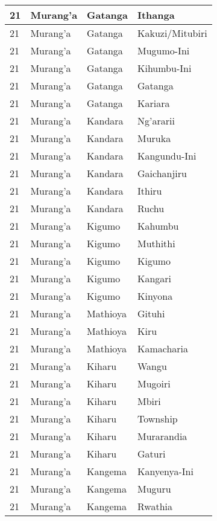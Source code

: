 \begin{table}[!ht]
\begin{tabular}{|l|l|l|l|}
        21 & Murang’a & Gatanga & Ithanga \\ \hline
        21 & Murang’a & Gatanga & Kakuzi/Mitubiri \\ \hline
        21 & Murang’a & Gatanga & Mugumo-Ini \\ \hline
        21 & Murang’a & Gatanga & Kihumbu-Ini \\ \hline
        21 & Murang’a & Gatanga & Gatanga \\ \hline
        21 & Murang’a & Gatanga & Kariara \\ \hline
        21 & Murang’a & Kandara & Ng’ararii \\ \hline
        21 & Murang’a & Kandara & Muruka \\ \hline
        21 & Murang’a & Kandara & Kangundu-Ini \\ \hline
        21 & Murang’a & Kandara & Gaichanjiru \\ \hline
        21 & Murang’a & Kandara & Ithiru \\ \hline
        21 & Murang’a & Kandara & Ruchu \\ \hline
        21 & Murang’a & Kigumo & Kahumbu \\ \hline
        21 & Murang’a & Kigumo & Muthithi \\ \hline
        21 & Murang’a & Kigumo & Kigumo \\ \hline
        21 & Murang’a & Kigumo & Kangari \\ \hline
        21 & Murang’a & Kigumo & Kinyona \\ \hline
        21 & Murang’a & Mathioya & Gituhi \\ \hline
        21 & Murang’a & Mathioya & Kiru \\ \hline
        21 & Murang’a & Mathioya & Kamacharia \\ \hline
        21 & Murang’a & Kiharu & Wangu \\ \hline
        21 & Murang’a & Kiharu & Mugoiri \\ \hline
        21 & Murang’a & Kiharu & Mbiri \\ \hline
        21 & Murang’a & Kiharu & Township \\ \hline
        21 & Murang’a & Kiharu & Murarandia \\ \hline
        21 & Murang’a & Kiharu & Gaturi \\ \hline
        21 & Murang’a & Kangema & Kanyenya-Ini \\ \hline
        21 & Murang’a & Kangema & Muguru \\ \hline
        21 & Murang’a & Kangema & Rwathia \\ \hline

\end{tabular}
\end{table}
